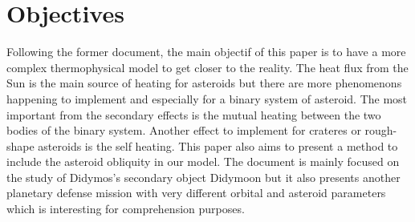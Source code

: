 \section{Objectives}
\label{objectives}

Following the former document, the main objectif of this paper is to have a more complex thermophysical model to get closer to the reality. The heat flux from the Sun is the main source of heating for asteroids but there are more phenomenons happening to implement and especially for a binary system of asteroid. The most important from the secondary effects is the mutual heating between the two bodies of the binary system. Another effect to implement for crateres or rough-shape asteroids is the self heating. This paper also aims to present a method to include the asteroid obliquity in our model. The document is mainly focused on the study of Didymos's secondary object Didymoon but it also presents another planetary defense mission with very different orbital and asteroid parameters which is interesting for comprehension purposes.
